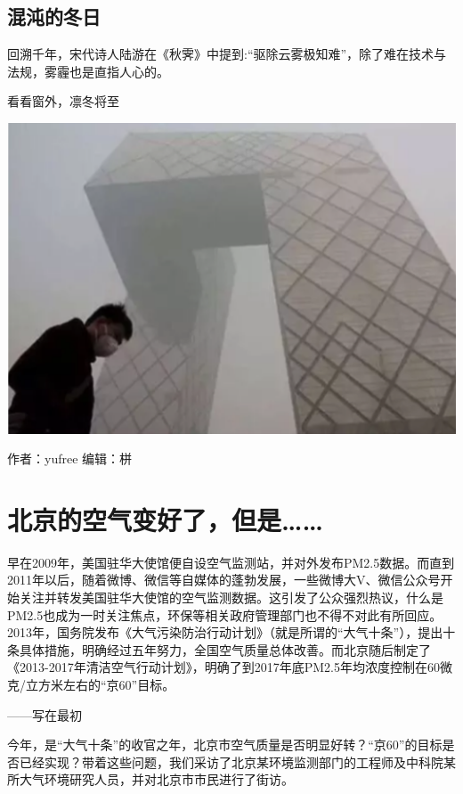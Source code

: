 \documentclass[]{book}
\begin{document}
\hypertarget{ux6df7ux6c8cux7684ux51acux65e5-1}{%
\subsection{混沌的冬日}\label{ux6df7ux6c8cux7684ux51acux65e5-1}}

回溯千年，宋代诗人陆游在《秋霁》中提到:``驱除云雾极知难''，除了难在技术与法规，雾霾也是直指人心的。

看看窗外，凛冬将至

\includegraphics[width=6.67in]{images/cw5}

作者：yufree
编辑：栟

\hypertarget{ux5317ux4eacux7684ux7a7aux6c14ux53d8ux597dux4e86ux4f46ux662f}{%
\section{北京的空气变好了，但是\ldots{}\ldots{}}\label{ux5317ux4eacux7684ux7a7aux6c14ux53d8ux597dux4e86ux4f46ux662f}}

早在2009年，美国驻华大使馆便自设空气监测站，并对外发布PM2.5数据。而直到2011年以后，随着微博、微信等自媒体的蓬勃发展，一些微博大V、微信公众号开始关注并转发美国驻华大使馆的空气监测数据。这引发了公众强烈热议，什么是PM2.5也成为一时关注焦点，环保等相关政府管理部门也不得不对此有所回应。2013年，国务院发布《大气污染防治行动计划》（就是所谓的``大气十条''），提出十条具体措施，明确经过五年努力，全国空气质量总体改善。而北京随后制定了《2013-2017年清洁空气行动计划》，明确了到2017年底PM2.5年均浓度控制在60微克/立方米左右的``京60''目标。

------写在最初

今年，是``大气十条''的收官之年，北京市空气质量是否明显好转？``京60''的目标是否已经实现？带着这些问题，我们采访了北京某环境监测部门的工程师及中科院某所大气环境研究人员，并对北京市市民进行了街访。
\end{document}
